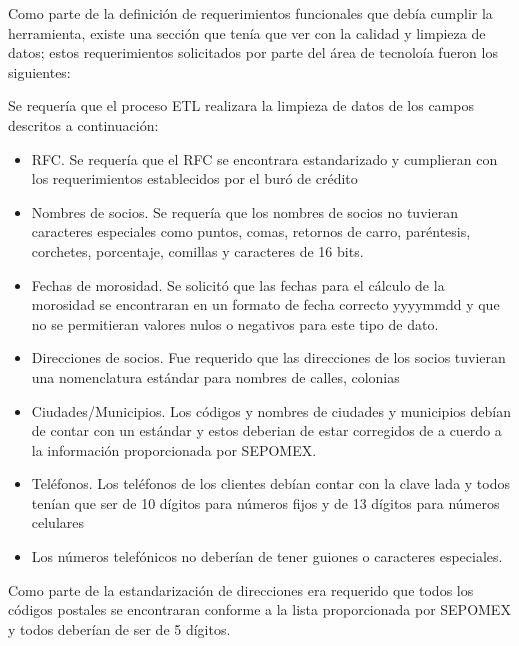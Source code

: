 Como parte de la definición de requerimientos funcionales que debía cumplir la
herramienta, existe una sección que tenía que ver con la calidad y limpieza de
datos; estos requerimientos solicitados por parte del área de tecnoloía fueron
los siguientes:

Se requería que el proceso ETL realizara la limpieza de datos de los campos
descritos a continuación:

\begin{itemize}

\item RFC. Se requería que el RFC se encontrara estandarizado y cumplieran con
  los requerimientos establecidos por el buró de crédito

\item Nombres de socios. Se requería que los nombres de socios no tuvieran
  caracteres especiales como puntos, comas, retornos de carro, paréntesis,
  corchetes, porcentaje, comillas y caracteres de 16 bits.

\item Fechas de morosidad. Se solicitó que las fechas para el cálculo de la
  morosidad se encontraran en un formato de fecha correcto yyyymmdd y que no se
  permitieran valores nulos o negativos para este tipo de dato.

\item Direcciones de socios. Fue requerido que las direcciones de los socios
  tuvieran una nomenclatura estándar para nombres de calles, colonias

\item Ciudades/Municipios. Los códigos y nombres de ciudades y municipios debían
  de contar con un estándar y estos deberian de estar corregidos de a cuerdo a
  la información proporcionada por SEPOMEX.

\item Teléfonos. Los teléfonos de los clientes debían contar con la clave lada y
  todos tenían que ser de 10 dígitos para números fijos y de 13 dígitos para
  números celulares

\item Los números telefónicos no deberían de tener guiones o caracteres
  especiales.

\end{itemize}

Como parte de la estandarización de direcciones era requerido que todos los
códigos postales se encontraran conforme a la lista proporcionada por SEPOMEX y
todos deberían de ser de 5 dígitos.

\cleardoublepage

